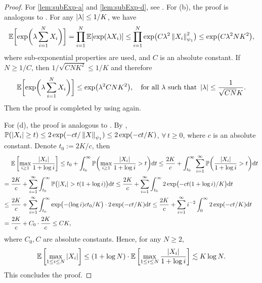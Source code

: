 \begin{proof}
    For \ref{lem:subExp-a} and \ref{lem:subExp-d}, see \cite[Exercise 2.7.11, Lemma 2.7.6, Lemma 2.7.7]{vershynin2018high}. For (b), the proof is analogous to \cite[Proposition 2.6.1]{vershynin2018high}. For any $\left|{\lambda}\right| \le 1/K$, we have
    \begin{equation*}
            \mathbb{E}\biggl[ \exp\biggl(\lambda \sum_{i=1}^N X_i \biggr) \biggr]
             = \prod_{i=1}^{N} \mathbb{E}[\exp(\lambda X_i)]
            \le \prod_{i=1}^{N} \exp\bigl( C \lambda^2 \left\|{X_i}\right\|_{\psi_1}^2 \bigr)
             \le \exp\bigl( C \lambda^2 N K^2 \bigr),
    \end{equation*}
    where sub-exponential properties \cite[Proposition 2.7.1 (iv)(v)]{vershynin2018high} are used, and $C$ is an absolute constant. If $N \ge 1/C$, then $1/\sqrt{CNK^2} \le 1/K $ and therefore
    \[ \mathbb{E}\biggl[ \exp\biggl(\lambda \sum_{i=1}^N X_i \biggr) \biggr] \le \exp\bigl( \lambda^2 C N K^2 \bigr),
    \quad \text{for all $\lambda$ such that }  \left|{\lambda}\right| \le \frac{1}{\sqrt{CN} K}.  \]
    Then the proof is completed by using \cite[Proposition 2.7.1 (iv)(v)]{vershynin2018high} again.

    For (d), the proof is analogous to \cite[Exercise 2.5.10]{vershynin2018high}. By \cite[Proposition 2.7.1 (i)(iv)]{vershynin2018high}, $\mathbb{P}(\left|{X_i}\right| \ge t) \le 2\exp(-ct/\left\|{X}\right\|_{\psi_1}) \le 2\exp(-ct/K)$, $\forall\, t \ge 0$, where $c$ is an absolute constant. Denote $t_0 := 2K/c$, then
	\begin{align*}
	& \mathbb{E}\left[ \max_{i \ge 1} \frac{\left|{X_i}\right|}{1 + \log i} \right]
	\le t_0 + \int_{t_0}^\infty \mathbb{P}\biggl( \max_{i \ge 1} \frac{\left|{X_i}\right|}{1 + \log i} > t \biggr) \textup{d} t 
	\le \frac{2K}{c} + \int_{t_0}^\infty  \sum_{i=1}^\infty  \mathbb{P}\biggl( \frac{\left|{X_i}\right|}{1 + \log i} > t \biggr) \textup{d} t
	\\
	= {} & \frac{2K}{c} + \sum_{i=1}^\infty \int_{t_0}^\infty  \mathbb{P}\bigl( \left|{X_i}\right| > t (1 + \log i) \bigr) \textup{d} t
	   \le \frac{2K}{c} + \sum_{i=1}^\infty \int_{t_0}^\infty 2\exp\bigl(-ct(1 + \log i)/K\bigr) \textup{d} t\\
	\le {} & 
    \frac{2K}{c} + \sum_{i=1}^\infty \int_{t_0}^\infty  \exp\bigl(- (\log i) ct_0/K \bigr) \cdot  2\exp(-ct/K) \textup{d} t
        \le 
    \frac{2K}{c} + \sum_{i=1}^\infty i^{-2} \int_{0}^\infty 2\exp(-ct/K) \textup{d} t \\
	= {} & \frac{2K}{c} + C_0 \cdot \frac{2K}{c} 
        \le C K,
	\end{align*}
    where $C_0, C$ are absolute constants. Hence, for any $N \ge 2$,
	\[ \mathbb{E}\left[\max_{1 \le i \le N} \left|{X_i}\right|\right] 
	\le (1+\log N) \cdot \mathbb{E}\left[ \max_{1 \le i \le N} \frac{\left|{X_i}\right|}{1 + \log i} \right] \lesssim K \log N.
	\]
    This concludes the proof.
\end{proof}




